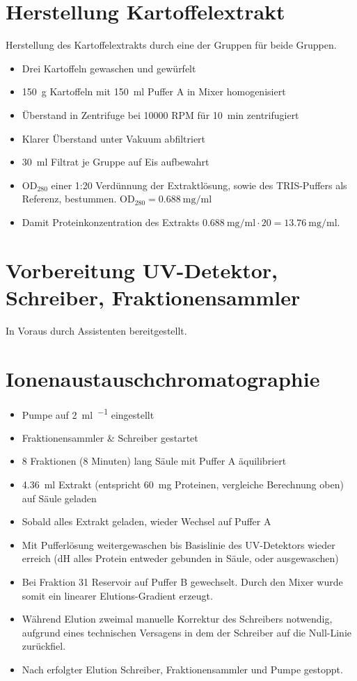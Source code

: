 \documentclass[a4paper,german]{scrreprt}
\begin{document}
\section{Herstellung Kartoffelextrakt}

Herstellung des Kartoffelextrakts durch eine der Gruppen für beide Gruppen.

\begin{itemize}
	\item Drei Kartoffeln gewaschen und gewürfelt
	\item \SI{150}{g} Kartoffeln mit \SI{150}{ml} Puffer A in Mixer homogenisiert
	\item Überstand in Zentrifuge bei 10000 RPM für \SI{10}{min} zentrifugiert
	\item Klarer Überstand unter Vakuum abfiltriert
	\item \SI{30}{ml} Filtrat je Gruppe auf Eis aufbewahrt
	\item $\text{OD}_{280}$ einer 1:20 Verdünnung der Extraktlösung, sowie
		des TRIS-Puffers als Referenz, bestummen. $\text{OD}_{280} =
		\SI{0.688}{\mg \per \ml}$
	\item Damit Proteinkonzentration des Extrakts $\SI{0.688}{\mg \per \ml}
		\cdot 20 = \SI{13.76}{\mg \per \ml}$.
\end{itemize}

\section{Vorbereitung UV-Detektor, Schreiber, Fraktionensammler}

In Voraus durch Assistenten bereitgestellt.

\section{Ionenaustauschchromatographie}

\begin{itemize}
	\item Pumpe auf \SI{2}{\ml \per \min} eingestellt
	\item Fraktionensammler \& Schreiber gestartet
	\item 8 Fraktionen (8 Minuten) lang Säule mit Puffer A äquilibriert
	\item \SI{4.36}{ml} Extrakt (entspricht \SI{60}{mg} Proteinen,
		vergleiche Berechnung oben) auf Säule geladen
	\item Sobald alles Extrakt geladen, wieder Wechsel auf Puffer A
	\item Mit Pufferlösung weitergewaschen bis Basislinie des UV-Detektors
		wieder erreich (dH alles Protein entweder gebunden in Säule,
		oder ausgewaschen)
	\item Bei Fraktion 31 Reservoir auf Puffer B gewechselt. Durch den
		Mixer wurde somit ein linearer Elutions-Gradient erzeugt.
	\item Während Elution zweimal manuelle Korrektur des Schreibers
		notwendig, aufgrund eines technischen Versagens in dem der
		Schreiber auf die Null-Linie zurückfiel.
	\item Nach erfolgter Elution Schreiber, Fraktionensammler und Pumpe gestoppt.
\end{itemize}
\end{document}
